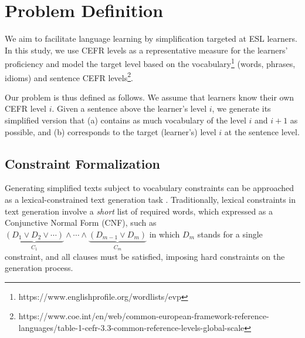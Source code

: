 \section{Problem Definition}\label{sec:method}

We aim to facilitate language learning by simplification targeted at ESL learners. 
In this study, we use CEFR levels as a representative measure for the learners' proficiency and model the target level based on the vocabulary\footnote{https://www.englishprofile.org/wordlists/evp}  (words, phrases, idioms) 
and sentence 
CEFR levels\footnote{https://www.coe.int/en/web/common-european-framework-reference-languages/table-1-cefr-3.3-common-reference-levels-global-scale}. 


Our problem is thus defined as follows. 
We assume that learners know their own CEFR level $i$. 
Given a sentence above the learner's level $i$, we generate its simplified version that (a) contains as much vocabulary of the level $i$ and $i+1$ as possible, and (b) corresponds to the target (learner's) level $i$ at the sentence level.  %

\subsection {Constraint Formalization} \label{sec:task}
Generating simplified texts subject to vocabulary constraints can be approached as a lexical-constrained text generation task \cite{zetsu-etal-2022-lexically}. 
Traditionally, lexical constraints in text generation involve a \emph{short} list of required words, which \citet{lu-etal-2021-neurologic} expressed as a Conjunctive Normal Form (CNF), such as $\underbrace{(D_1 \lor D_2 \lor \cdots )}_{C_1} \land \cdots \land \underbrace{(D_{m-1}  \lor D_m)}_{C_m}$ in which $D_m$ stands for a single constraint, and all clauses must be satisfied, imposing hard constraints on the generation process.

